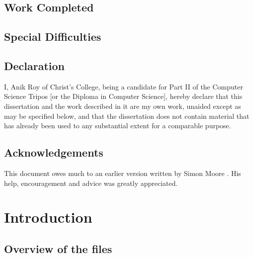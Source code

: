 \documentclass[12pt,twoside,notitlepage]{report}
\begin{document}
\section*{Work Completed}


\section*{Special Difficulties}

 
\newpage
\section*{Declaration}

I, Anik Roy of Christ's College, being a candidate for Part II of the Computer
Science Tripos [or the Diploma in Computer Science], hereby declare
that this dissertation and the work described in it are my own work,
unaided except as may be specified below, and that the dissertation
does not contain material that has already been used to any substantial
extent for a comparable purpose.

\bigskip
{}

\medskip
{}

\cleardoublepage

\tableofcontents

\listoffigures

\newpage
\section*{Acknowledgements}

This document owes much to an earlier version written by Simon Moore
\cite{Moore95}.  His help, encouragement and advice was greatly 
appreciated.


\cleardoublepage        %

\setcounter{page}{1}
\pagestyle{headings}

\chapter{Introduction}

\section{Overview of the files}
\end{document}
